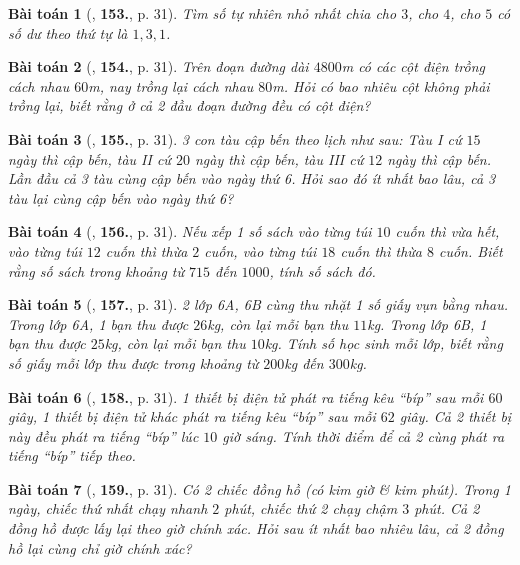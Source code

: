 \documentclass{article}
\numberwithin{equation}{section}
\newtheorem{baitoan}{Bài toán}[section]
\begin{document}
\begin{baitoan}[\cite{Binh_Toan_6_tap_1}, \textbf{153.}, p. 31]
	Tìm số tự nhiên nhỏ nhất chia cho $3$, cho $4$, cho $5$ có số dư theo thứ tự là $1,3,1$.
\end{baitoan}

\begin{baitoan}[\cite{Binh_Toan_6_tap_1}, \textbf{154.}, p. 31]
	Trên đoạn đường dài $4800$m có các cột điện trồng cách nhau $60$m, nay trồng lại cách nhau $80$m. Hỏi có bao nhiêu cột không phải trồng lại, biết rằng ở cả 2 đầu đoạn đường đều có cột điện?
\end{baitoan}

\begin{baitoan}[\cite{Binh_Toan_6_tap_1}, \textbf{155.}, p. 31]
	3 con tàu cập bến theo lịch như sau: Tàu I cứ $15$ ngày thì cập bến, tàu II cứ $20$ ngày thì cập bến, tàu III cứ $12$ ngày thì cập bến. Lần đầu cả 3 tàu cùng cập bến vào ngày thứ 6. Hỏi sao đó ít nhất bao lâu, cả 3 tàu lại cùng cập bến vào ngày thứ 6?
\end{baitoan}

\begin{baitoan}[\cite{Binh_Toan_6_tap_1}, \textbf{156.}, p. 31]
	Nếu xếp 1 số sách vào từng túi $10$ cuốn thì vừa hết, vào từng túi $12$ cuốn thì thừa $2$ cuốn, vào từng túi $18$ cuốn thì thừa $8$ cuốn. Biết rằng số sách trong khoảng từ $715$ đến $1000$, tính số sách đó.
\end{baitoan}

\begin{baitoan}[\cite{Binh_Toan_6_tap_1}, \textbf{157.}, p. 31]
	2 lớp 6A, 6B cùng thu nhặt 1 số giấy vụn bằng nhau. Trong lớp 6A, 1 bạn thu được $26$kg, còn lại mỗi bạn thu $11$kg. Trong lớp 6B, 1 bạn thu được $25$kg, còn lại mỗi bạn thu $10$kg. Tính số học sinh mỗi lớp, biết rằng số giấy mỗi lớp thu được trong khoảng từ $200$kg đến $300$kg.
\end{baitoan}

\begin{baitoan}[\cite{Binh_Toan_6_tap_1}, \textbf{158.}, p. 31]
	1 thiết bị điện tử phát ra tiếng kêu ``bíp'' sau mỗi $60$ giây, 1 thiết bị điện tử khác phát ra tiếng kêu ``bíp'' sau mỗi $62$ giây. Cả 2 thiết bị này đều phát ra tiếng ``bíp'' lúc $10$ giờ sáng. Tính thời điểm để cả 2 cùng phát ra tiếng ``bíp'' tiếp theo.
\end{baitoan}

\begin{baitoan}[\cite{Binh_Toan_6_tap_1}, \textbf{159.}, p. 31]
	Có 2 chiếc đồng hồ (có kim giờ \& kim phút). Trong 1 ngày, chiếc thứ nhất chạy nhanh $2$ phút, chiếc thứ 2 chạy chậm $3$ phút. Cả 2 đồng hồ được lấy lại theo giờ chính xác. Hỏi sau ít nhất bao nhiêu lâu, cả 2 đồng hồ lại cùng chỉ giờ chính xác?
\end{baitoan}
\end{document}
